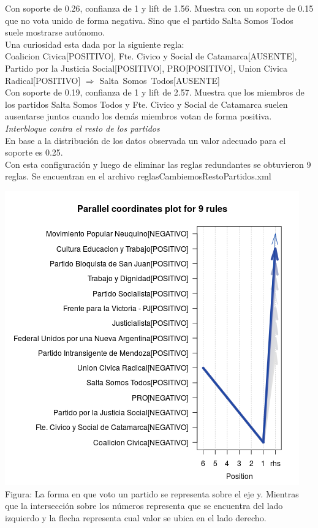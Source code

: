 \documentclass{endm}
\begin{document}
Con soporte de 0.26, confianza de 1 y lift de 1.56. Muestra  con un soporte de 0.15 que no vota unido de forma negativa. Sino que el partido Salta Somos Todos suele mostrarse autónomo. \\

Una curiosidad esta dada por la siguiente regla: \\

{Coalicion Civica[POSITIVO],                    
Fte. Civico y Social de Catamarca[AUSENTE], 
Partido por la Justicia Social[POSITIVO], 
PRO[POSITIVO], 
Union Civica Radical[POSITIVO]}             $\Longrightarrow$  {Salta\ Somos\ Todos[AUSENTE]} \\

Con soporte de 0.19, confianza de 1 y lift de 2.57. Muestra que los miembros de los partidos Salta Somos Todos y Fte. Civico y Social de Catamarca suelen ausentarse juntos cuando los demás miembros votan de forma positiva. \\


\textit{Interbloque contra el resto de los partidos} \\

En base a la distribución de los datos observada un valor adecuado para el soporte es 0.25. \\

Con esta configuración y luego de eliminar las reglas redundantes se obtuvieron 9 reglas. Se encuentran en el archivo reglasCambiemosRestoPartidos.xml  \\

\begin{center}
\includegraphics[scale=0.5]{graficos/paracoordCambiemosRestoPartidos.png} \\
\scriptsize{Figura: La forma en que voto un partido se representa sobre el eje y. Mientras que la intersección sobre  los números representa que se encuentra del lado izquierdo y la flecha representa cual valor se ubica en el lado derecho.}
\end{center} 
\end{document}
